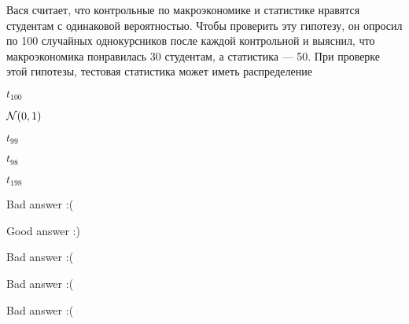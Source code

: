 
\begin{question}
Вася считает, что контрольные по макроэкономике и статистике нравятся
студентам с одинаковой вероятностью. Чтобы проверить эту гипотезу, он
опросил по 100 случайных однокурсников после каждой контрольной и
выяснил, что макроэкономика понравилась 30 студентам, а статистика ---
50. При проверке этой гипотезы, тестовая статистика может иметь
распределение
\begin{answerlist}
  \item \(t_{100}\)
  \item \(\mathcal{N}(0,1)\)
  \item \(t_{99}\)
  \item \(t_{98}\)
  \item \(t_{198}\)
\end{answerlist}
\end{question}

\begin{solution}
\begin{answerlist}
  \item Bad answer :(
  \item Good answer :)
  \item Bad answer :(
  \item Bad answer :(
  \item Bad answer :(
\end{answerlist}
\end{solution}

